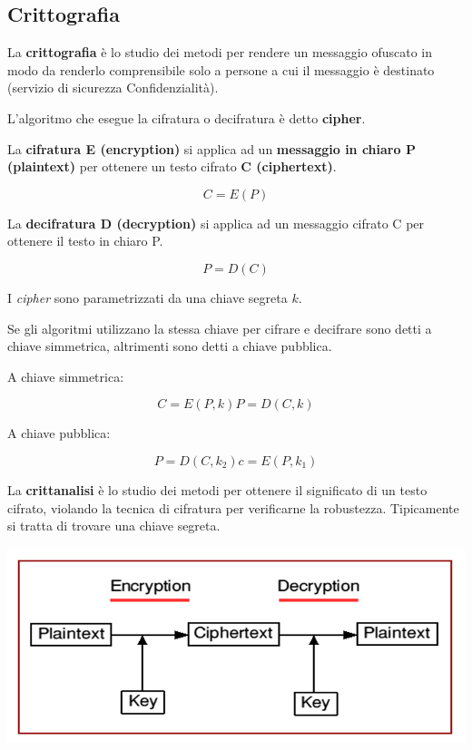     \subsection{Crittografia}
        La \textbf{crittografia} è lo studio dei metodi per rendere un messaggio ofuscato in modo da renderlo comprensibile solo a persone a cui il messaggio è destinato (servizio di sicurezza Confidenzialità).
    
        L'algoritmo che esegue la cifratura o decifratura è detto \textbf{cipher}.
    
        La \textbf{cifratura E (encryption)} si applica ad un \textbf{messaggio in chiaro P (plaintext)} per ottenere un testo cifrato \textbf{C (ciphertext)}.

        \begin{equation*}
            C = E(P)
        \end{equation*}

        La \textbf{decifratura D (decryption)} si applica ad un messaggio cifrato C per ottenere il testo in chiaro P.

        \begin{equation*}
            P = D(C)
        \end{equation*}

        I \textit{cipher} sono parametrizzati da una chiave segreta $k$.

        Se gli algoritmi utilizzano la stessa chiave per cifrare e decifrare sono detti a chiave simmetrica, altrimenti sono detti a chiave pubblica.

        A chiave simmetrica:

        \begin{equation*}
            C = E(P,k) P = D(C,k)
        \end{equation*}

        A chiave pubblica:

        \begin{equation*}
            P = D(C,k_2) c = E(P,k_1)
        \end{equation*}

        La \textbf{crittanalisi} è lo studio dei metodi per ottenere il significato di un testo cifrato, violando la tecnica di cifratura per verificarne la robustezza. Tipicamente si tratta di trovare una chiave segreta.

        \begin{center}
            \includegraphics[scale=0.38]{chapters/7/assets/schema_g.png}
        \end{center}

